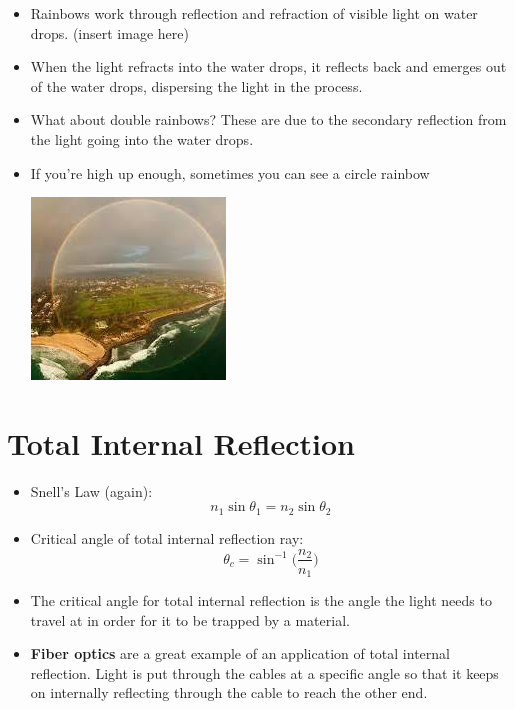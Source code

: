 \documentclass[12pt, letterpaper]{article}
\begin{document}
\begin{itemize}
    \item Rainbows work through reflection and refraction of visible light on water drops. (insert image here)
    \item When the light refracts into the water drops, it reflects back and emerges out of the water drops, dispersing the light in the process.
    \item What about double rainbows? These are due to the secondary reflection from the light going into the water drops.
    \item If you're high up enough, sometimes you can see a circle rainbow \begin{center}
        \includegraphics{images/circlerainbow.jpeg}
    \end{center}
\end{itemize}

\section*{Total Internal Reflection}

\begin{itemize}
    \item Snell's Law (again): \[n_{1}\sin{\theta_{1}} = n_{2}\sin{\theta_{2}}\]
    \item Critical angle of total internal reflection ray: \[\theta_{c} = \sin^{-1}{\Big(\frac{n_{2}}{n_{1}}\Big)}\]
    \item The critical angle for total internal reflection is the angle the light needs to travel at in order for it to be trapped by a material.
    \item \textbf{Fiber optics} are a great example of an application of total internal reflection. Light is put through the cables at a specific angle so that it keeps on internally reflecting through the cable to reach the other end.
\end{itemize}
\end{document}
